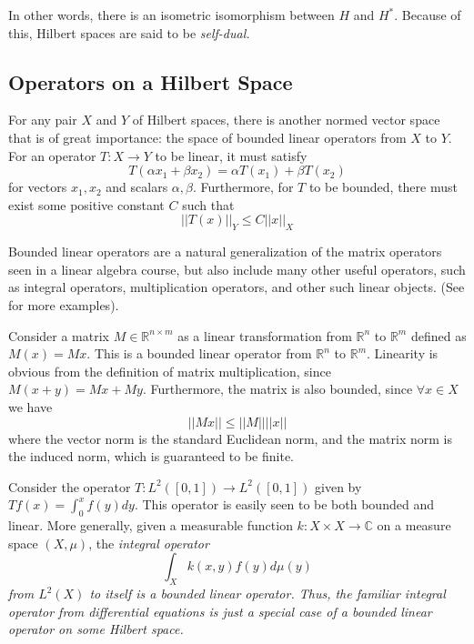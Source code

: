 In other words, there is an isometric isomorphism between $H$ and $H^*$. Because of this,
Hilbert spaces are said to be \em self-dual\em.

\subsection{Operators on a Hilbert Space}
For any pair $X$ and $Y$ of Hilbert spaces, there is another normed vector space
that is of great importance: the space of bounded linear operators from $X$ to
$Y$. For an operator $T:X\to Y$ to be linear, it must satisfy
\[
    T(\alpha x_1 + \beta x_2) = \alpha T(x_1) + \beta T(x_2)
\]
for vectors $x_1, x_2$ and scalars $\alpha, \beta$. Furthermore, for $T$ to be
bounded, there must exist some positive constant $C$ such that
\[
    ||T(x)||_Y \leq C||x||_X
\]

Bounded linear operators are a natural generalization of the matrix operators
seen in a linear algebra course, but also include many other useful operators,
such as integral operators, multiplication operators, and other such linear
objects. (See \cite[p. 32-34]{MacCluer2009} for more examples).

\begin{example}
    Consider a matrix $M\in \mathbb{R}^{n\times m}$ as a linear transformation
    from $\mathbb{R}^n$ to $\mathbb{R}^m$ defined as $M(x) = Mx$. This is a
    bounded linear operator from $\mathbb{R}^n$ to $\mathbb{R}^m$. Linearity is
    obvious from the definition of matrix multiplication, since $M(x+y) = Mx +
    My$. Furthermore, the matrix is also bounded, since $\forall x \in X$ we
    have
    \[
        ||Mx|| \leq ||M||||x||
    \]
    where the vector norm is the standard Euclidean norm, and the matrix norm is
    the induced norm, which is guaranteed to be finite. %
\end{example}

\begin{example}
    Consider the operator
    $T:L^2([0,1])\to L^2([0,1])$ given by $Tf(x) = \int_0^x f(y)dy$.
    This operator is
    easily seen to be both bounded and linear.
    More generally, given a measurable function $k:X\times X \to \mathbb{C}$ on
    a measure space $(X,\mu)$, the \em integral operator\em
    \[
        \int_X k(x,y)f(y)d\mu(y)
    \]
    from $L^2(X)$ to itself is a bounded linear operator. Thus, the familiar
    integral operator from differential equations is just a special case of a
    bounded linear operator on some Hilbert space.
\end{example}


